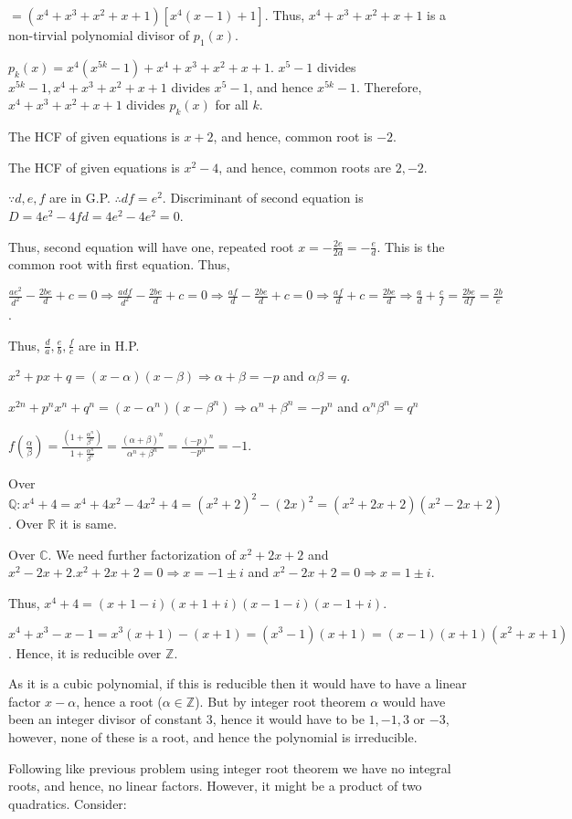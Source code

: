   $= (x^4 + x^3 + x^2 + x + 1)[x^4(x - 1) + 1]$. Thus, $x^4 + x^3 + x^2 + x + 1$ is a non-tirvial polynomial
  divisor of $p_1(x)$.

  $p_k(x) = x^4(x^{5k} - 1) + x^4 + x^3 + x^2 + x + 1$. $x^5 - 1$ divides $x^{5k} - 1, x^4 + x^3 + x^2 + x +
  1$ divides $x^5 - 1$, and hence $x^{5k} - 1$. Therefore, $x^4 + x^3 + x^2 + x + 1$ divides $p_k(x)$ for
  all $k$.
\item The HCF of given equations is $x + 2$, and hence, common root is $-2$.
\item The HCF of given equations is $x^2 - 4$, and hence, common roots are $2, -2$.
\item $\because d, e, f$ are in G.P. $\therefore df = e^2$. Discriminant of second equation is $D = 4e^2 -
  4fd = 4e^2 - 4e^2 = 0$.

  Thus, second equation will have one, repeated root $x = -\frac{2e}{2d} = -\frac{e}{d}$. This is the common
  root with first equation. Thus,

  $\frac{ae^2}{d^2} - \frac{2be}{d} + c = 0 \Rightarrow \frac{adf}{d^2} - \frac{2be}{d} + c = 0 \Rightarrow
  \frac{af}{d} - \frac{2be}{d} + c = 0 \Rightarrow \frac{af}{d} + c = \frac{2be}{d} \Rightarrow \frac{a}{d}
  + \frac{c}{f} = \frac{2be}{df} = \frac{2b}{e}$.

  Thus, $\frac{d}{a}, \frac{e}{b}, \frac{f}{c}$ are in H.P.
\item $x^2 + px + q = (x - \alpha)(x - \beta) \Rightarrow \alpha + \beta = -p$ and $\alpha\beta = q$.

  $x^{2n} + p^nx^n + q^n = (x - \alpha^n)(x - \beta^n) \Rightarrow \alpha^n + \beta^n = -p^n$ and
  $\alpha^n\beta^n = q^n$

  $f\left(\frac{\alpha}{\beta}\right) = \frac{\left(1 + \frac{\alpha^n}{\beta^n}\right)}{1 +
  \frac{\alpha^n}{\beta^n}} = \frac{(\alpha + \beta)^n}{\alpha^n + \beta^n} = \frac{(-p)^n}{-p^n} = -1$.
\item Over $\mathbb{Q}: x^4 + 4 = x^4 + 4x^2 - 4x^2 + 4 = (x^2 + 2)^2 - (2x)^2 = (x^2 + 2x + 2)(x^2 - 2x +
  2)$. Over $\mathbb{R}$ it is same.

  Over $\mathbb{C}$. We need further factorization of $x^2 + 2x + 2$ and $x^2 - 2x + 2. x^2 + 2x + 2 = 0
  \Rightarrow x = -1 \pm i$ and $x^2 - 2x + 2 = 0 \Rightarrow x = 1 \pm i$.

  Thus, $x^4 + 4 = (x + 1 - i)(x + 1 + i)(x - 1 - i)(x - 1 + i)$.
\item $x^4 + x^3 - x - 1 = x^3(x + 1) - (x + 1) = (x^3 - 1)(x + 1) = (x - 1)(x + 1)(x^2 + x + 1)$. Hence, it
  is reducible over $\mathbb{Z}$.
\item As it is a cubic polynomial, if this is reducible then it would have to have a linear factor $x -
  \alpha$, hence a root ($\alpha\in\mathbb{Z}$). But by integer root theorem $\alpha$ would have been an
  integer divisor of constant $3$, hence it would have to be $1, -1, 3$ or $-3$, however, none of these is a
  root, and hence the polynomial is irreducible.
\item Following like previous problem using integer root theorem we have no integral roots, and hence, no
  linear factors. However, it might be a product of two quadratics. Consider:

